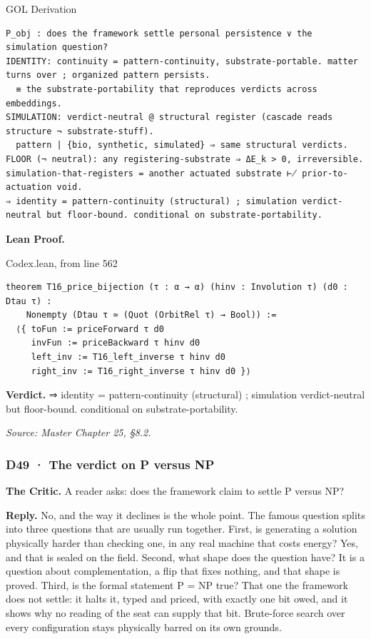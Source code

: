 \documentclass[10pt,twocolumn]{article}
\begin{document}
\begin{golbox}{GOL Derivation}
\begin{lstlisting}[style=golv]
P_obj : does the framework settle personal persistence ∨ the simulation question?
IDENTITY: continuity = pattern-continuity, substrate-portable. matter turns over ; organized pattern persists.
  ≡ the substrate-portability that reproduces verdicts across embeddings.
SIMULATION: verdict-neutral @ structural register (cascade reads structure ¬ substrate-stuff).
  pattern | {bio, synthetic, simulated} ⇒ same structural verdicts.
FLOOR (¬ neutral): any registering-substrate ⇒ ΔE_k > 0, irreversible. simulation-that-registers = another actuated substrate ⊬ prior-to-actuation void.
⇒ identity = pattern-continuity (structural) ; simulation verdict-neutral but floor-bound. conditional on substrate-portability.
\end{lstlisting}
\end{golbox}

\textbf{Lean Proof.}

\begin{leanexcerpt}{Codex.lean, from line 562}
\begin{lstlisting}[style=leanx,firstnumber=562]
theorem T16_price_bijection (τ : α → α) (hinv : Involution τ) (d0 : Dtau τ) :
    Nonempty (Dtau τ ≃ (Quot (OrbitRel τ) → Bool)) :=
  ⟨{ toFun := priceForward τ d0
     invFun := priceBackward τ hinv d0
     left_inv := T16_left_inverse τ hinv d0
     right_inv := T16_right_inverse τ hinv d0 }⟩
\end{lstlisting}
\end{leanexcerpt}

\textbf{Verdict.} ⇒ identity = pattern-continuity (structural) ;
simulation verdict-neutral but floor-bound. conditional on
substrate-portability.

\emph{Source: Master Chapter 25, §8.2.}

\hypertarget{d49-the-verdict-on-p-versus-np}{%
\subsubsection{D49 · The verdict on P versus
NP}\label{d49-the-verdict-on-p-versus-np}}

\textbf{The Critic.} A reader asks: does the framework claim to settle P
versus NP?

\textbf{Reply.} No, and the way it declines is the whole point. The
famous question splits into three questions that are usually run
together. First, is generating a solution physically harder than
checking one, in any real machine that costs energy? Yes, and that is
sealed on the field. Second, what shape does the question have? It is a
question about complementation, a flip that fixes nothing, and that
shape is proved. Third, is the formal statement P = NP true? That one
the framework does not settle: it halts it, typed and priced, with
exactly one bit owed, and it shows why no reading of the seat can supply
that bit. Brute-force search over every configuration stays physically
barred on its own grounds.
\end{document}
